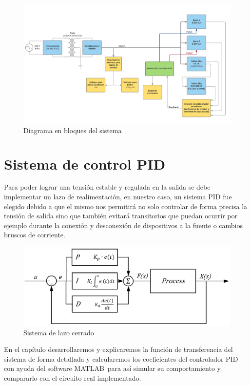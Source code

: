 \documentclass[12pt]{report}
\begin{document}
\begin{figure}[H]
	\centering
	\includegraphics[width=\textwidth,height=\textheight,keepaspectratio]{diagrama_bloques}
	\caption{Diagrama en bloques del sistema}
\end{figure}

\section{Sistema de control PID}

Para poder lograr una tensión estable y regulada en la salida se debe implementar un lazo de realimentación, en nuestro caso, un sistema PID fue elegido debido a que el mismo nos permitirá no solo controlar de forma precisa la tensión de salida sino que también evitará transitorios que puedan ocurrir por ejemplo durante la conexión y desconexión de dispositivos a la fuente o cambios bruscos de corriente.

\begin{figure}[H]
	\centering
	\includegraphics[width=\textwidth,height=\textheight,keepaspectratio]{closed_loop}
	\caption{Sistema de lazo cerrado}
\end{figure}

En el capítulo \textit{} desarrollaremos y explicaremos la función de transferencia del sistema de forma detallada y calcularemos los coeficientes del controlador PID con ayuda del software MATLAB\textregistered \ para así simular su comportamiento y compararlo con el circuito real implementado.
\end{document}
